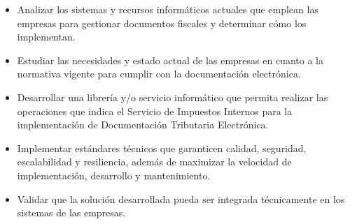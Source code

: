 \begin{itemize}
	\item Analizar los sistemas y recursos informáticos actuales que emplean las empresas para gestionar documentos fiscales y determinar cómo los implementan.
	\item Estudiar las necesidades y estado actual de las empresas en cuanto a la normativa vigente para cumplir con la documentación electrónica.
	\item Desarrollar una librería y/o servicio informático que permita realizar las operaciones que indica el Servicio de Impuestos Internos para la implementación de Documentación Tributaria Electrónica.
	\item Implementar estándares técnicos que garanticen calidad, seguridad, escalabilidad y resiliencia, además de maximizar la velocidad de implementación, desarrollo y mantenimiento.
	\item Validar que la solución desarrollada pueda ser integrada técnicamente en los sistemas de las empresas.
\end{itemize}